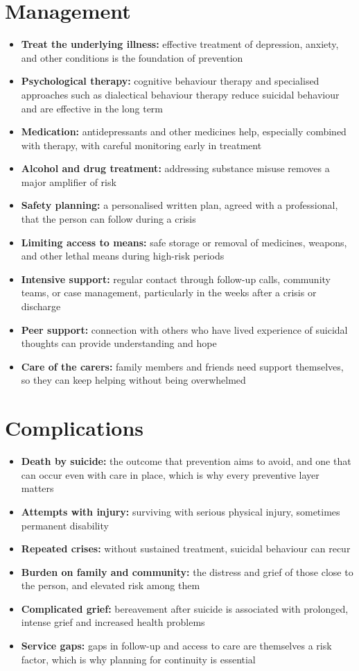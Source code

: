 \section*{Management}
\begin{itemize}
    \item \textbf{Treat the underlying illness:} effective treatment of depression, anxiety, and other conditions is the foundation of prevention
    \item \textbf{Psychological therapy:} cognitive behaviour therapy and specialised approaches such as dialectical behaviour therapy reduce suicidal behaviour and are effective in the long term
    \item \textbf{Medication:} antidepressants and other medicines help, especially combined with therapy, with careful monitoring early in treatment
    \item \textbf{Alcohol and drug treatment:} addressing substance misuse removes a major amplifier of risk
    \item \textbf{Safety planning:} a personalised written plan, agreed with a professional, that the person can follow during a crisis
    \item \textbf{Limiting access to means:} safe storage or removal of medicines, weapons, and other lethal means during high-risk periods
    \item \textbf{Intensive support:} regular contact through follow-up calls, community teams, or case management, particularly in the weeks after a crisis or discharge
    \item \textbf{Peer support:} connection with others who have lived experience of suicidal thoughts can provide understanding and hope
    \item \textbf{Care of the carers:} family members and friends need support themselves, so they can keep helping without being overwhelmed
\end{itemize}

\section*{Complications}
\begin{itemize}
    \item \textbf{Death by suicide:} the outcome that prevention aims to avoid, and one that can occur even with care in place, which is why every preventive layer matters
    \item \textbf{Attempts with injury:} surviving with serious physical injury, sometimes permanent disability
    \item \textbf{Repeated crises:} without sustained treatment, suicidal behaviour can recur
    \item \textbf{Burden on family and community:} the distress and grief of those close to the person, and elevated risk among them
    \item \textbf{Complicated grief:} bereavement after suicide is associated with prolonged, intense grief and increased health problems
    \item \textbf{Service gaps:} gaps in follow-up and access to care are themselves a risk factor, which is why planning for continuity is essential
\end{itemize}

